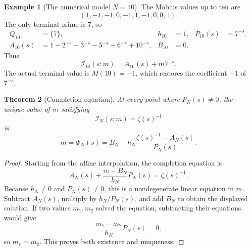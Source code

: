 \documentclass[11pt]{amsart}
\numberwithin{equation}{section}
\theoremstyle{plain}
\newtheorem{theorem}{Theorem}[section]
\theoremstyle{definition}
\newtheorem{example}[theorem]{Example}
\theoremstyle{remark}
\newcommand{\1}{\mathbf{1}}
\begin{document}
\begin{example}[The numerical model \(N=10\)]
\label{ex:N10_affine_interpolation}
The Möbius values up to ten are
\begin{equation}
(1,-1,-1,0,-1,1,-1,0,0,1).
\label{eq:N10_mobius_vector}
\end{equation}
The only terminal prime is \(7\), so
\begin{align}
Q_{10}&=\{7\},
&h_{10}&=1,
&P_{10}(s)&=7^{-s},
\label{eq:N10_terminal_data_detailed}
\\
A_{10}(s)
&=
1-2^{-s}-3^{-s}-5^{-s}+6^{-s}+10^{-s},
&B_{10}&=0.
\label{eq:N10_A_B_detailed}
\end{align}
Thus
\begin{equation}
\mathcal I_{10}(s;m)
=
A_{10}(s)+m7^{-s}.
\label{eq:N10_interpolation_detailed}
\end{equation}
The actual terminal value is \(M(10)=-1\), which restores the coefficient
\(-1\) of \(7^{-s}\).
\end{example}

\begin{theorem}[Completion equation]
\label{thm:completion_equation}
At every point where \(P_N(s)\neq0\), the unique value of \(m\) satisfying
\begin{equation}
\mathcal I_N(s;m)=\zeta(s)^{-1}
\label{eq:completion_equation}
\end{equation}
is
\begin{equation}
\boxed{
 m=\Phi_N(s)
 =
 B_N+h_N\frac{\zeta(s)^{-1}-A_N(s)}{P_N(s)}.
}
\label{eq:completion_solution}
\end{equation}
\end{theorem}

\begin{proof}
Starting from the affine interpolation, the completion equation is
\begin{equation}
A_N(s)+\frac{m-B_N}{h_N}P_N(s)
=
\zeta(s)^{-1}.
\label{eq:completion_equation_expanded}
\end{equation}
Because \(h_N\neq0\) and \(P_N(s)\neq0\), this is a nondegenerate linear
equation in \(m\).  Subtract \(A_N(s)\), multiply by \(h_N/P_N(s)\), and
add \(B_N\) to obtain the displayed solution.  If two values \(m_1,m_2\)
solved the equation, subtracting their equations would give
\begin{equation}
\frac{m_1-m_2}{h_N}P_N(s)=0,
\label{eq:completion_uniqueness}
\end{equation}
so \(m_1=m_2\).  This proves both existence and uniqueness.
\end{proof}
\end{document}
